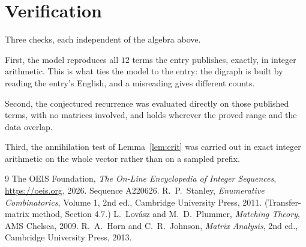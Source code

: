 \documentclass[11pt,a4paper]{article}
\theoremstyle{plain}
\theoremstyle{definition}
\begin{document}
\section{Verification}

Three checks, each independent of the algebra above.

First, the model reproduces all $12$ terms the entry publishes, exactly, in integer
arithmetic. This is what ties the model to the entry: the digraph is built by reading the
entry's English, and a misreading gives different counts.

Second, the conjectured recurrence was evaluated directly on those published terms, with no
matrices involved, and holds wherever the proved range and the data overlap.

Third, the annihilation test of Lemma~\ref{lem:crit} was carried out in exact integer
arithmetic on the whole vector rather than on a sampled prefix.

\begin{thebibliography}{9}
 The OEIS Foundation, \emph{The On-Line Encyclopedia of Integer
Sequences}, \url{https://oeis.org}, 2026. Sequence A220626.
 R.~P.~Stanley, \emph{Enumerative Combinatorics}, Volume 1, 2nd ed.,
Cambridge University Press, 2011. (Transfer-matrix method, Section 4.7.)
 L.~Lov\'asz and M.~D.~Plummer, \emph{Matching Theory}, AMS Chelsea,
2009.
 R.~A.~Horn and C.~R.~Johnson, \emph{Matrix Analysis}, 2nd ed., Cambridge
University Press, 2013.
\end{thebibliography}
\end{document}
